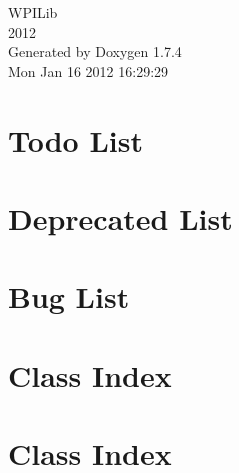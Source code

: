 \documentclass[a4paper]{book}
\begin{document}
\hypersetup{pageanchor=false}
\begin{titlepage}
\vspace*{7cm}
\begin{center}
{\Large WPILib \\[1ex]\large 2012 }\\
\vspace*{1cm}
{\large Generated by Doxygen 1.7.4}\\
\vspace*{0.5cm}
{\small Mon Jan 16 2012 16:29:29}\\
\end{center}
\end{titlepage}
\clearemptydoublepage
{}
\tableofcontents
\clearemptydoublepage
{}
\hypersetup{pageanchor=true}
\chapter{Todo List}
\label{todo}
\hypertarget{todo}{}

\chapter{Deprecated List}
\label{deprecated}
\hypertarget{deprecated}{}

\chapter{Bug List}
\label{bug}
\hypertarget{bug}{}

\chapter{Class Index}

\chapter{Class Index}

\end{document}
